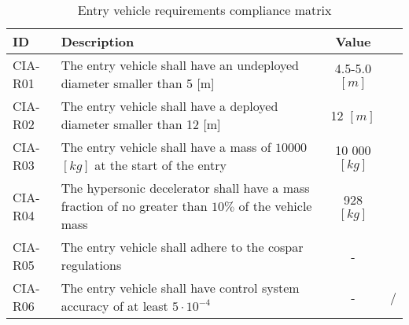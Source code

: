 \begin{table}[H]
\centering
	\caption{Entry vehicle requirements compliance matrix} 
	\label{tab:compv}
	\begin{tabular}{|p{}|p{}|c|c|}
	    \hline
	    ID          & Description   & Value &                                                                                           \\ \hline \hline
	CIA-R01 & The entry vehicle shall have an undeployed diameter smaller than 5 [m]                   & 4.5-5.0 $[m]$  & \cmark     				            \\ \hline
	CIA-R02 & The entry vehicle shall have a deployed diameter smaller than 12 [m]                     & 12 $[m]$ &  \cmark 				            \\ \hline	
	CIA-R03 & The entry vehicle shall have a mass of $10 000$ $[kg]$ at the start of the entry           & 10 000 $[kg]$ &  \cmark          				            \\ \hline
	CIA-R04 & The hypersonic decelerator shall have a mass fraction of no greater than $10\%$ of the vehicle mass	& 928 $[kg]$ & \cmark \\ \hline 
	CIA-R05 &  The entry vehicle shall adhere to the \gls{cospar} regulations  & - & \cmark \\ \hline
	CIA-R06 &  The entry vehicle shall have control system accuracy of at least $5\cdot 10^{-4}$ & - & \cmark /\xmark\\ \hline
    \end{tabular}
\end{table}

\newpage
